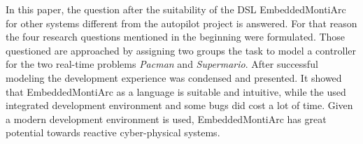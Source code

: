 In this paper, the question after the suitability of the DSL EmbeddedMontiArc for other systems different from the autopilot project is answered. For that reason the four research questions mentioned in the beginning were formulated. Those questioned are approached by assigning two groups the task to model a controller for the two real-time problems \textit{Pacman} and \textit{Supermario}.
After successful modeling the development experience was condensed and presented. It showed that EmbeddedMontiArc as a language is suitable and intuitive, while the used integrated development environment and some bugs did cost a lot of time.
Given a modern development environment is used, EmbeddedMontiArc has great potential towards reactive cyber-physical systems.